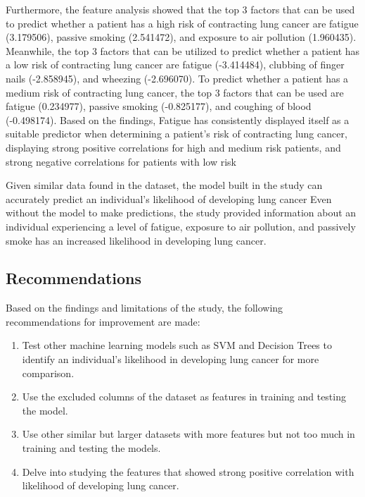 \documentclass[runningheads]{llncs}
\begin{document}
Furthermore, the feature analysis showed that the top 3 factors that can be used to predict whether a patient has a high risk of contracting lung cancer are fatigue (3.179506), passive smoking (2.541472), and exposure to air pollution (1.960435). Meanwhile, the top 3 factors that can be utilized to predict whether a patient has a low risk of contracting lung cancer are fatigue (-3.414484), clubbing of finger nails (-2.858945), and wheezing (-2.696070). To predict whether a patient has a medium risk of contracting lung cancer, the top 3 factors that can be used are fatigue (0.234977), passive smoking (-0.825177), and coughing of blood (-0.498174). Based on the findings, Fatigue has consistently displayed itself as a suitable predictor when determining a patient's risk of contracting lung cancer, displaying strong positive correlations for high and medium risk patients, and strong negative correlations for patients with low risk
	
Given similar data found in the dataset, the model built in the study can accurately predict an individual’s likelihood of developing lung cancer Even without the model to make predictions, the study provided information about an individual experiencing a level of fatigue, exposure to air pollution, and passively smoke has an increased likelihood in developing lung cancer.  

\subsection{Recommendations}

Based on the findings and limitations of the study, the following recommendations for improvement are made:
\begin{enumerate}
\item Test other machine learning models such as SVM and Decision Trees to identify an individual’s likelihood in developing lung cancer for more comparison. 
\item Use the excluded columns of the dataset as features in training and testing the model.
\item Use other similar but larger datasets with more features but not too much in training and testing the models.
\item Delve into studying the features that showed strong positive correlation with likelihood of developing lung cancer.
\end{enumerate}



\end{document}
